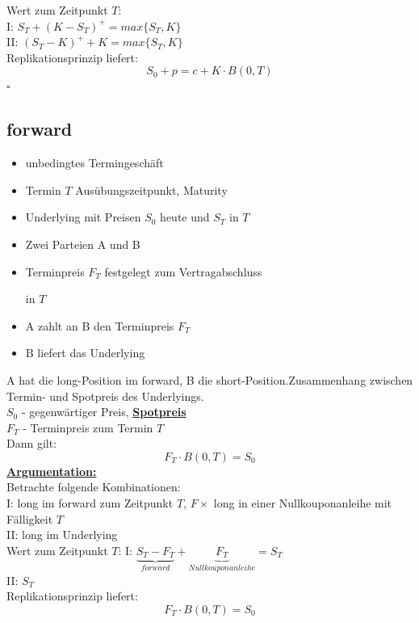 \documentclass[a4paper, pagesize=pdftex, pdftex, twoside, headsepline, index=totoc,toc=listof, fontsize=10pt, cleardoublepage=empty, headinclude, DIV=13, BCOR=13mm]{scrartcl}
\newcommand{\bet}[1]{\uline{\textbf{#1}}} %
\newcommand{\Index}[1]{\uline{\textbf{#1}}\index{#1}} %
\begin{document}
Wert zum Zeitpunkt $T$: \\
I: $S_T + (K-S_T)^+ = max\{S_T,K\}$ \\
II: $(S_T - K)^+ + K = max\{S_T,K\}$ \\

Replikationsprinzip liefert:
\[
	S_0 + p = c + K \cdot B(0,T)
\]
\hfill $\square$


\subsection{forward} %
\label{sub:forward}

\begin{itemize}
	\item unbedingtes Termingeschäft
	\item Termin $T$ Ausübungszeitpunkt, Maturity
	\item Underlying mit Preisen $S_0$ heute und $S_T$ in $T$
	\item Zwei Parteien A und B
	\item Terminpreis $F_T$ festgelegt zum Vertragabschluss
	\item[in $T$]
	\item A zahlt an B den Terminpreis $F_T$
	\item B liefert das Underlying
\end{itemize}

A hat die long-Position im forward, B die short-Position.Zusammenhang zwischen Termin- und Spotpreis des Underlyings.\\
\hspace{2cm} $S_0$ - gegenwärtiger Preis, \Index{Spotpreis}\\
\hspace{2cm} $F_T$ - Terminpreis zum Termin $T$\\
Dann gilt:
\[ F_T \cdot B(0,T) = S_0\]
\bet{Argumentation:}\\
Betrachte folgende Kombinationen:\\
I: long im forward zum Zeitpunkt $T$, $F \times$ long in einer Nullkouponanleihe mit Fälligkeit $T$\\
II: long im Underlying\\
Wert zum Zeitpunkt $T$:
I: $\underbrace{S_T - F_T}_{forward} + \underbrace{F_T}_{Nullkouponanleihe} = S_T$\\
II: $S_T$\\
Replikationsprinzip liefert:
\[F_T \cdot B(0,T) = S_0 \]
\end{document}

